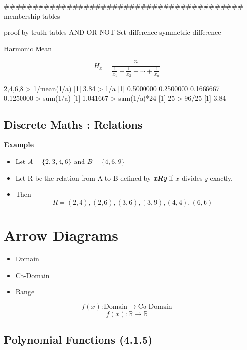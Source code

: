 ##########################################
membership tables

proof by truth tables
AND
OR
NOT
Set difference
symmetric difference



\newpage


Harmonic Mean

\[ H_x = \frac{ n }{ \frac{ 1 }{ x_1 } + \frac{ 1 }{ x_2 } + \cdots + \frac{ 1 }{ x_n } } \]

2,4,6,8
> 1/mean(1/a)
[1] 3.84
> 1/a
[1] 0.5000000 0.2500000 0.1666667 0.1250000
> sum(1/a)
[1] 1.041667
> sum(1/a)*24
[1] 25
> 96/25
[1] 3.84



\subsection{Discrete Maths : Relations}

\textbf{Example}
\begin{itemize}

\item Let $A = \{2, 3, 4, 6\}$ and $B = \{4, 6, 9\}$
\item Let R be the relation from A to B defined by \textit{\textbf{xRy}} if $x$
divides $y$ exactly.
\item  Then
\[R = {(2, 4), (2, 6), (3, 6), (3, 9), (4, 4), (6, 6)}\]
\end{itemize}



\section{Arrow Diagrams}

\begin{itemize}

\item Domain
\item Co-Domain
\item Range
\end{itemize}
\[  f(x) : \mbox{Domain} \rightarrow \mbox{Co-Domain} \]
\[  f(x) : \mathbb{R} \rightarrow \mathbb{R} \]
\newpage
\subsection*{Polynomial Functions (4.1.5)}

